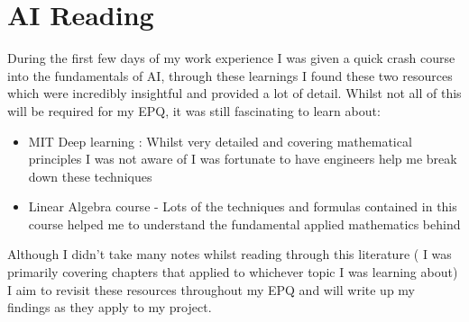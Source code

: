 \section{AI Reading}
\label{research:AIReading}
During the first few days of my work experience I was given a quick crash course into the fundamentals of AI, through these learnings I found these two resources which were incredibly insightful and provided a lot of detail. Whilst not all of this will be required for my EPQ, it was still fascinating to learn about:
\begin{itemize}
    \item MIT Deep learning \cite{DeepLearning}: Whilst very detailed and covering mathematical principles I was not aware of I was fortunate to have engineers help me break down these techniques
    \item Linear Algebra course \cite{3Blue1Brown} - Lots of the techniques and formulas contained in this course helped me to understand the fundamental applied mathematics behind
\end{itemize}
Although I didn't take many notes whilst reading through this literature ( I was primarily covering chapters that applied to whichever topic I was learning about) I aim to revisit these resources throughout my EPQ and will write up my findings as they apply to my project.
